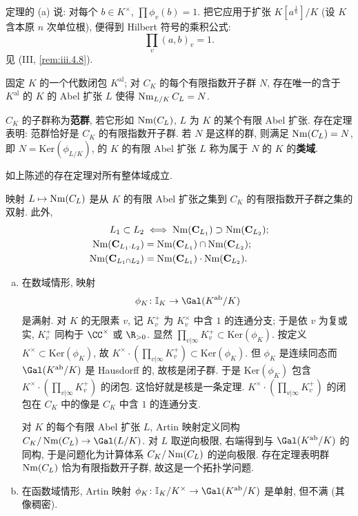 \begin{example}\label{ex:v.5.4}
定理的 (a) 说: 对每个 $b\in K^{\times}$, $\prod\phi_v(b)=1$. 把它应用于扩张 $K[a^{\frac{1}{n}}]/K$ (设 $K$ 含本原 $n$ 次单位根), 便得到 Hilbert 符号的乘积公式:
\[
\prod_v(a,b)_v=1.
\]
见 (III, \ref{rem:iii.4.8}).
\end{example}

\begin{theorem}[存在定理]\label{thm:v.5.5}
固定 $K$ 的一个代数闭包 $K^{\mathrm{al}}$; 对 $C_K$ 的每个有限指数开子群 $N$, 存在唯一的含于 $K^{\mathrm{al}}$ 的 $K$ 的 Abel 扩张 $L$ 使得 $\operatorname{Nm}_{L/K}C_L=N$.
\end{theorem}

$C_K$ 的子群称为\textbf{范群}, 若它形如 $\operatorname{Nm}(C_L)$, $L$ 为 $K$ 的某个有限 Abel 扩张. 存在定理表明: 范群恰好是 $C_K$ 的有限指数开子群. 若 $N$ 是这样的群, 则满足 $\operatorname{Nm}(C_L)=N$, 即 $N=\mathrm{Ker}(\phi_{L/K})$, 的 $K$ 的有限 Abel 扩张 $L$ 称为属于 $N$ 的 $K$ 的\textbf{类域}.

如上陈述的存在定理对所有整体域成立.

\begin{corollary}\label{cor:v.5.6}
映射 $L\mapsto\operatorname{Nm}(C_L)$ 是从 $K$ 的有限 Abel 扩张之集到 $C_K$ 的有限指数开子群之集的双射. 此外,
\begin{align*}
L_1\subset L_2&\iff\operatorname{Nm}(\mathbf{C}_{L_1})\supset\operatorname{Nm}(\mathbf{C}_{L_2});\\
\operatorname{Nm}(\mathbf{C}_{L_1\cdot L_2})&=\operatorname{Nm}(\mathbf{C}_{L_1})\cap\operatorname{Nm}(\mathbf{C}_{L_2});\\
\operatorname{Nm}(\mathbf{C}_{L_1\cap L_2})&=\operatorname{Nm}(\mathbf{C}_{L_1})\cdot\operatorname{Nm}(\mathbf{C}_{L_2}).
\end{align*}
\end{corollary}

\begin{remark}\label{rem:v.5.7}
\begin{enumerate}[(a)]
\item 在数域情形, 映射
\[
\phi_K\colon\mathbb{I}_K\to\Gal(K^{\mathrm{ab}}/K)
\]
是满射. 对 $K$ 的无限素 $v$, 记 $K_v^+$ 为 $K_v^{\times}$ 中含 $1$ 的连通分支; 于是依 $v$ 为复或实, $K_v^+$ 同构于 $\CC^{\times}$ 或 $\R_{>0}$. 显然 $\prod_{v|\infty}K_v^+\subset\mathrm{Ker}(\phi_K)$. 按定义 $K^{\times}\subset\mathrm{Ker}(\phi_K)$, 故 $K^{\times}\cdot(\prod_{v|\infty}K_v^+)\subset\mathrm{Ker}(\phi_K)$. 但 $\phi_K$ 是连续同态而 $\Gal(K^{\mathrm{ab}}/K)$ 是 Hausdorff 的, 故核是闭子群. 于是 $\mathrm{Ker}(\phi_K)$ 包含 $K^{\times}\cdot(\prod_{v|\infty}K_v^+)$ 的闭包. 这恰好就是核是一条定理. $K^{\times}\cdot(\prod_{v|\infty}K_v^+)$ 的闭包在 $C_K$ 中的像是 $C_K$ 中含 $1$ 的连通分支.

对 $K$ 的每个有限 Abel 扩张 $L$, Artin 映射定义同构 $C_K/\Nm(C_L)\to\Gal(L/K)$. 对 $L$ 取逆向极限, 右端得到与 $\Gal(K^{\mathrm{ab}}/K)$ 的同构, 于是问题化为计算体系 $C_K/\operatorname{Nm}(C_L)$ 的逆向极限. 存在定理表明群 $\operatorname{Nm}(C_L)$ 恰为有限指数开子群, 故这是一个拓扑学问题.

\item 在函数域情形, Artin 映射 $\phi_K\colon\mathbb{I}_K/K^{\times}\to\Gal(K^{\mathrm{ab}}/K)$ 是单射, 但不满 (其像稠密).
\end{enumerate}
\end{remark}


